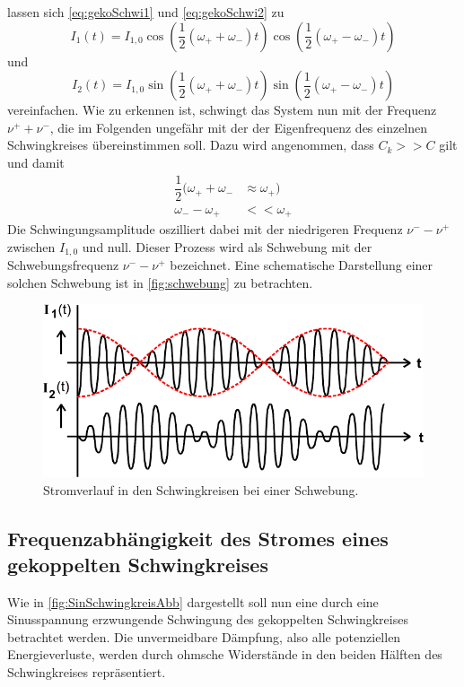 lassen sich \eqref{eq:gekoSchwi1} und \eqref{eq:gekoSchwi2} zu
\begin{equation*}
    I_1(t) = I_{1,0}\cos(\dfrac{1}{2}(ω_+ + ω_-)t) \cos(\dfrac{1}{2}(ω_+ - ω_-)t) 
\end{equation*}
und
\begin{equation*}
    I_2(t) = I_{1,0}\sin(\dfrac{1}{2}(ω_+ + ω_-)t) \sin(\dfrac{1}{2}(ω_+ - ω_-)t)
\end{equation*}
vereinfachen. Wie zu erkennen ist, schwingt das System nun mit der Frequenz $ν^+ + ν^-$, die im Folgenden ungefähr mit der der Eigenfrequenz des einzelnen Schwingkreises übereinstimmen soll.
Dazu wird angenommen, dass $C_k >> C$ gilt und damit
\begin{align*}
    \dfrac{1}{2}(ω_+ + ω_- & \approx ω_+) \\
    ω_- - ω_+ & << ω_+
\end{align*}
Die Schwingungsamplitude oszilliert dabei mit der niedrigeren Frequenz $ν^- - ν^+$ zwischen $I_{1,0}$ und null. Dieser Prozess wird als Schwebung mit der Schwebungsfrequenz $ν^- - ν^+$ bezeichnet.
Eine schematische Darstellung einer solchen Schwebung ist in \autoref{fig:schwebung} zu betrachten.

\begin{figure}[H]
    \centering
    \includegraphics{SchwebungAbb.pdf}
    \caption{Stromverlauf in den Schwingkreisen bei einer Schwebung\cite{ap04}.}
    \label{fig:schwebung}
\end{figure}

\subsection{Frequenzabhängigkeit des Stromes eines gekoppelten Schwingkreises}

Wie in \autoref{fig:SinSchwingkreisAbb} dargestellt soll nun eine durch eine Sinusspannung erzwungende Schwingung des gekoppelten Schwingkreises betrachtet werden.
Die unvermeidbare Dämpfung, also alle potenziellen Energieverluste, werden durch ohmsche Widerstände in den beiden Hälften des Schwingkreises repräsentiert.

